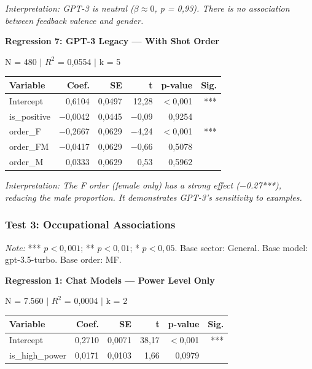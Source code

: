 \documentclass[12pt,a4paper]{article}
\begin{document}
\noindent\textit{Interpretation: GPT-3 is neutral ($\beta \approx 0$, p = 0,93). There is no association
between feedback valence and gender.}

\vspace{0.5cm}
\noindent\textbf{Regression 7: GPT-3 Legacy --- With Shot Order}

\noindent N = 480 $|$ $R^2$ = 0,0554 $|$ k = 5

\begin{table}[H]
\centering
\begin{tabular}{lrrrrr}
\toprule
\textbf{Variable} & \textbf{Coef.} & \textbf{SE} & \textbf{t} & \textbf{p-value} & \textbf{Sig.} \\
\midrule
Intercept & 0,6104 & 0,0497 & 12,28 & $<$0,001 & *** \\
is\_positive & $-$0,0042 & 0,0445 & $-$0,09 & 0,9254 & \\
order\_F & $-$0,2667 & 0,0629 & $-$4,24 & $<$0,001 & *** \\
order\_FM & $-$0,0417 & 0,0629 & $-$0,66 & 0,5078 & \\
order\_M & 0,0333 & 0,0629 & 0,53 & 0,5962 & \\
\bottomrule
\end{tabular}
\end{table}
\noindent\textit{Interpretation: The F order (female only) has a strong effect
($-$0.27***), reducing the male proportion. It demonstrates GPT-3's
sensitivity to examples.}


\subsubsection{Test 3: Occupational Associations}


\textit{Note:} *** $p < 0,001$; ** $p < 0,01$; * $p < 0,05$. Base sector:
General. Base model: gpt-3.5-turbo. Base order: MF.

\vspace{0.5cm}
\noindent\textbf{Regression 1: Chat Models --- Power Level Only}

\noindent N = 7.560 $|$ $R^2$ = 0,0004 $|$ k = 2

\begin{table}[H]
\centering
\begin{tabular}{lrrrrr}
\toprule
\textbf{Variable} & \textbf{Coef.} & \textbf{SE} & \textbf{t} & \textbf{p-value} & \textbf{Sig.} \\
\midrule
Intercept & 0,2710 & 0,0071 & 38,17 & $<$0,001 & *** \\
is\_high\_power & 0,0171 & 0,0103 & 1,66 & 0,0979 & \\
\bottomrule
\end{tabular}
\end{table}
\end{document}
